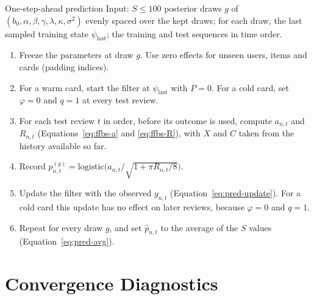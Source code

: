 \begin{algobox}{One-step-ahead prediction}\label{alg:predict}
  Input: $S \le 100$ posterior draws $g$ of $(b_0, \alpha, \beta, \gamma, \lambda, \kappa, \sigma^2)$
  evenly spaced over the kept draws; for each draw, the last sampled training state $\psi_{\mathrm{last}}$;
  the training and test sequences in time order.
  \begin{enumerate}[leftmargin=2em, itemsep=2pt]
    \item Freeze the parameters at draw $g$. Use zero effects for unseen users, items and cards
      (padding indices).
    \item For a warm card, start the filter at $\psi_{\mathrm{last}}$ with $P = 0$. For a cold card,
      set $\varphi = 0$ and $q = 1$ at every test review.
    \item For each test review $t$ in order, before its outcome is used, compute $a_{n,t}$ and $R_{n,t}$
      (Equations~\eqref{eq:ffbs-a} and \eqref{eq:ffbs-R}), with $X$ and $C$ taken from the history
      available so far.
    \item Record $p^{(g)}_{n,t} = \mathrm{logistic}\bigl(a_{n,t}/\sqrt{1+\pi R_{n,t}/8}\bigr)$.
    \item Update the filter with the observed $y_{n,t}$ (Equation~\eqref{eq:pred-update}). For a cold
      card this update has no effect on later reviews, because $\varphi = 0$ and $q = 1$.
    \item Repeat for every draw $g$, and set $\hat p_{n,t}$ to the average of the $S$ values
      (Equation~\eqref{eq:pred-avg}).
  \end{enumerate}
\end{algobox}

\section{Convergence Diagnostics}
\label{sec:method-diagnostics}

